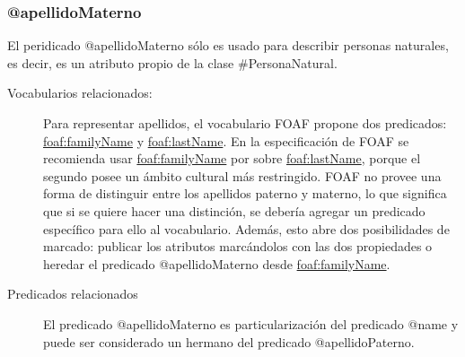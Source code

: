 \subsubsection{@apellidoMaterno}

El peridicado @apellidoMaterno sólo es usado para describir personas
naturales, es decir, es un atributo propio de la clase
\#PersonaNatural.

\begin{description}
  
\item[{\sf Vocabularios relacionados:}]
  Para representar apellidos, el vocabulario FOAF propone dos
  predicados:
  \url{foaf:familyName} y \url{foaf:lastName}. En la especificación de
  FOAF se recomienda usar \url{foaf:familyName} por sobre
  \url{foaf:lastName}, porque el segundo posee un ámbito cultural más
  restringido. FOAF no provee una forma de distinguir entre los
  apellidos paterno y materno, lo que significa que si se quiere hacer
  una distinción, se debería agregar un predicado específico para ello
  al vocabulario. Además, esto abre dos posibilidades de marcado:
  publicar los atributos marcándolos con las dos propiedades o heredar
  el predicado @apellidoMaterno desde \url{foaf:familyName}.
\item[{\sf Predicados relacionados}]
  El predicado @apellidoMaterno es particularización del
  predicado @name y puede ser considerado un hermano del predicado
  @apellidoPaterno.
\end{description}
